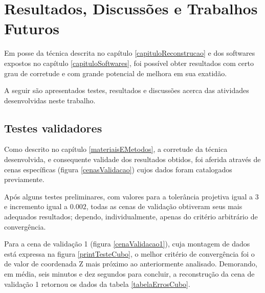 \chapter{Resultados, Discussões e Trabalhos Futuros}
	\label{capituloFinal}
	
	Em posse da técnica descrita no capítulo \ref{capituloReconstrucao} e dos softwares expostos no capítulo \ref{capituloSoftwares}, foi possível obter resultados com certo grau de corretude e com grande potencial de melhora em sua exatidão.
	
	A seguir são apresentados testes, resultados e discussões acerca das atividades desenvolvidas neste trabalho.
	
	\section{Testes validadores}
		\label{secaoTestes}
		
		Como descrito no capítulo \ref{materiaisEMetodos}, a corretude da técnica desenvolvida, e consequente validade dos resultados obtidos, foi aferida através de cenas específicas (figura \ref{cenasValidacao}) cujos dados foram catalogados previamente.
		
		Após alguns testes preliminares, com valores para a tolerância projetiva igual a $3$ e incremento igual a $0.002$, todas as cenas de validação obtiveram seus mais adequados resultados; dependo, individualmente, apenas do critério arbitrário de convergência.
		
		Para a cena de validação 1 (figura \ref{cenaValidacao1}), cuja montagem de dados está expressa na figura \ref{printTesteCubo}, o melhor critério de convergência foi o de valor de coordenada Z mais próximo ao anteriormente analisado. Demorando, em média, seis minutos e dez segundos para concluir, a reconstrução da cena de validação 1 retornou os dados da tabela \ref{tabelaErrosCubo}.
		
